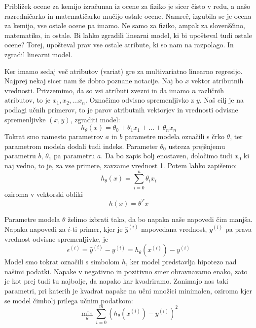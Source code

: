 Približek ocene za kemijo izračunan iz ocene za fiziko je sicer čisto
v redu, a našo razredničarko in matematičarko mučijo ostale
ocene. Namreč, izgubila se je ocena za kemijo, vse ostale ocene pa
imamo. Ne samo za fiziko, ampak za slovenščino, matematiko, in
ostale. Bi lahko zgradili linearni model, ki bi upošteval tudi ostale
ocene? Torej, upošteval prav vse ostale atribute, ki so nam na
razpolago. In zgradil linearni model.

Ker imamo sedaj več atributov (variat) gre za multivariatno linearno
regresijo. Najprej nekaj sicer nam že dobro poznane notacije. Naj bo $x$ vektor atributnih vrednosti. Privzemimo, da so vsi atributi zvezni in da imamo $n$ različnih atributov, to je $x_1, x_2,\ldots x_n$. Označimo odvisno spremenljivko z $y$. Naš cilj je na podlagi učnih primerov, to je parov atributnih vektorjev in vrednosti odvisne spremenljivke $(x,y)$, zgraditi model:
%
\begin{equation}
h_\theta(x)=\theta_0 + \theta_1 x_1 + \ldots + \theta_n x_n
\end{equation}
%
Tokrat smo namesto parametrov $a$ in $b$ parametre modela označili s
črko $\theta$, ter parametrom modela dodali tudi indeks. Parameter
$\theta_0$ ustreza prejšnjemu parametru $b$, $\theta_1$ pa parametru
$a$. Da bo zapis bolj enostaven, določimo tudi $x_0$ ki naj vedno, to je, za vse primere, zavzame vrednost 1. Potem lahko zapišemo:
\begin{equation}
h_\theta(x) =\sum_{i=0}^n \theta_i x_i
\end{equation}
oziroma v vektorski obliki
\begin{equation}
h(x)=\theta^T x
\end{equation}

Parametre modela $\theta$ želimo izbrati tako, da bo napaka naše napovedi čim manjša. Napaka napovedi za $i$-ti primer, kjer je $\hat{y}^{(i)}$ napovedana vrednost, $y^{(i)}$ pa prava vrednost odvisne spremenljivke, je
%
\begin{equation}
\epsilon^{(i)}=\hat{y}^{(i)}-y^{(i)}=h_\theta(x^{(i)})-y^{(i)}
\end{equation}
%
Model smo tokrat označili s simbolom $h$, ker model predstavlja
hipotezo nad našimi podatki. Napake v negativno in pozitivno smer
obravnavamo enako, zato je kot prej tudi tu najbolje, da napako kar
kvadriramo. Zanimajo nas taki parametri, pri katerih je kvadrat napake
na učni množici minimalen, oziroma kjer se model čimbolj prilega učnim
podatkom:
\begin{equation}
\min_\theta\sum_{i=0}^m(h_\theta(x^{(i)})-y^{(i)})^2
\end{equation}

